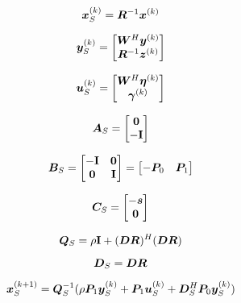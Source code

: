 \documentclass{article}
\begin{document}
\begin{equation}
\bm{x}_S^{(k)} = \bm{R}^{-1}\bm{x}^{(k)}
\end{equation}

\begin{equation}
\bm{y}_S^{(k)} = \begin{bmatrix} \bm{W}^H\bm{y}^{(k)} \\ \bm{R}^{-1}\bm{z}^{(k)} \end{bmatrix}
\end{equation}

\begin{equation}
\bm{u}_S^{(k)} = \begin{bmatrix} \bm{W}^H\bm{\eta}^{(k)} \\ \bm{\gamma}^{(k)} \end{bmatrix}
\end{equation}

\begin{equation}
\bm{A}_S = \begin{bmatrix} \bm{0} \\ -{\bf I} \end{bmatrix}
\end{equation}

\begin{equation}
\bm{B}_S = \begin{bmatrix} -{\bf I} & \bm{0} \\ \bm{0} & {\bf I} \end{bmatrix} = \begin{bmatrix} -\bm{P}_0 & \bm{P}_1 \end{bmatrix}
\end{equation}

\begin{equation}
\bm{C}_S = \begin{bmatrix} -\bm{s} \\ \bm{0} \end{bmatrix}
\end{equation}

\begin{equation}
\bm{Q}_S = \rho{\bf I} + (\bm{D}\bm{R})^H(\bm{D}\bm{R})
\end{equation}

\begin{equation}
\bm{D}_S = \bm{D}\bm{R}
\end{equation}



\begin{equation}
\bm{x}_S^{(k + 1)} = \bm{Q}_S^{-1}(\rho\bm{P}_1\bm{y}_S^{(k)} + \bm{P}_1\bm{u}_S^{(k)} + \bm{D}_S^H\bm{P}_0\bm{y}_S^{(k)})
\end{equation}
\end{document}

